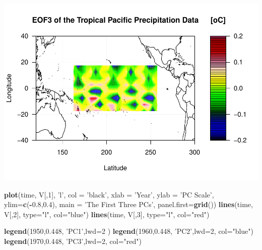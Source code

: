\documentclass[
]{article}
\newenvironment{Shaded}{\begin{snugshade}}{\end{snugshade}}
\newcommand{\DataTypeTok}[1]{\textcolor[rgb]{0.13,0.29,0.53}{#1}}
\newcommand{\DecValTok}[1]{\textcolor[rgb]{0.00,0.00,0.81}{#1}}
\newcommand{\FloatTok}[1]{\textcolor[rgb]{0.00,0.00,0.81}{#1}}
\newcommand{\KeywordTok}[1]{\textcolor[rgb]{0.13,0.29,0.53}{\textbf{#1}}}
\newcommand{\NormalTok}[1]{#1}
\newcommand{\OperatorTok}[1]{\textcolor[rgb]{0.81,0.36,0.00}{\textbf{#1}}}
\newcommand{\StringTok}[1]{\textcolor[rgb]{0.31,0.60,0.02}{#1}}
\begin{document}
\includegraphics{Assignment3_files/figure-latex/unnamed-chunk-2-3.pdf}

\begin{Shaded}
\begin{Highlighting}[]
\KeywordTok{plot}\NormalTok{(time, V[,}\DecValTok{1}\NormalTok{], }\StringTok{'l'}\NormalTok{, }\DataTypeTok{col =} \StringTok{'black'}\NormalTok{,}
     \DataTypeTok{xlab =} \StringTok{'Year'}\NormalTok{, }\DataTypeTok{ylab =} \StringTok{'PC Scale'}\NormalTok{, }\DataTypeTok{ylim=}\KeywordTok{c}\NormalTok{(}\OperatorTok{-}\FloatTok{0.8}\NormalTok{,}\FloatTok{0.4}\NormalTok{), }
     \DataTypeTok{main =} \StringTok{'The First Three PCs'}\NormalTok{, }\DataTypeTok{panel.first=}\KeywordTok{grid}\NormalTok{())}
\KeywordTok{lines}\NormalTok{(time, V[,}\DecValTok{2}\NormalTok{], }\DataTypeTok{type=}\StringTok{"l"}\NormalTok{, }\DataTypeTok{col=}\StringTok{"blue"}\NormalTok{)}
\KeywordTok{lines}\NormalTok{(time, V[,}\DecValTok{3}\NormalTok{], }\DataTypeTok{type=}\StringTok{"l"}\NormalTok{, }\DataTypeTok{col=}\StringTok{"red"}\NormalTok{)}


\KeywordTok{legend}\NormalTok{(}\DecValTok{1950}\NormalTok{,}\FloatTok{0.448}\NormalTok{, }\StringTok{'PC1'}\NormalTok{,}\DataTypeTok{lwd=}\DecValTok{2}\NormalTok{ )}
\KeywordTok{legend}\NormalTok{(}\DecValTok{1960}\NormalTok{,}\FloatTok{0.448}\NormalTok{, }\StringTok{'PC2'}\NormalTok{,}\DataTypeTok{lwd=}\DecValTok{2}\NormalTok{, }\DataTypeTok{col=}\StringTok{"blue"}\NormalTok{)}
\KeywordTok{legend}\NormalTok{(}\DecValTok{1970}\NormalTok{,}\FloatTok{0.448}\NormalTok{, }\StringTok{'PC3'}\NormalTok{,}\DataTypeTok{lwd=}\DecValTok{2}\NormalTok{, }\DataTypeTok{col=}\StringTok{"red"}\NormalTok{)}
\end{Highlighting}
\end{Shaded}
\end{document}
